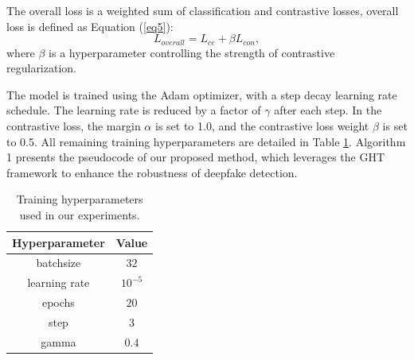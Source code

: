 \documentclass[final,5p,times]{elsarticle}
\begin{document}
The overall loss is a weighted sum of classification and contrastive losses, overall loss is defined as Equation (\ref{eq5}):
\begin{equation} \label{eq5}
L_{overall}=L_{ce}+\beta L_{con},
\end{equation}
where $\beta$ is a hyperparameter controlling the strength of contrastive regularization.

The model is trained using the Adam optimizer, with a step decay learning rate schedule. The learning rate is reduced by a factor of $\gamma$ after each step. In the contrastive loss, the margin $\alpha$ is set to 1.0, and the contrastive loss weight $\beta$ is set to 0.5. All remaining training hyperparameters are detailed in Table \ref{tab1}. Algorithm 1 presents the pseudocode of our proposed method, which leverages the GHT framework to enhance the robustness of deepfake detection.

\begin{table}
    \centering
    \begin{tabular}{cc}\toprule
         Hyperparameter& Value
\\\midrule
         batchsize& $32$\\
         learning rate& $10^{-5}$\\
         epochs& $20$\\
         step& $3$\\
         gamma& $0.4$\\ \bottomrule
    \end{tabular}
    \caption{Training hyperparameters used in our experiments.}
    \label{tab1}
\end{table}
\end{document}
